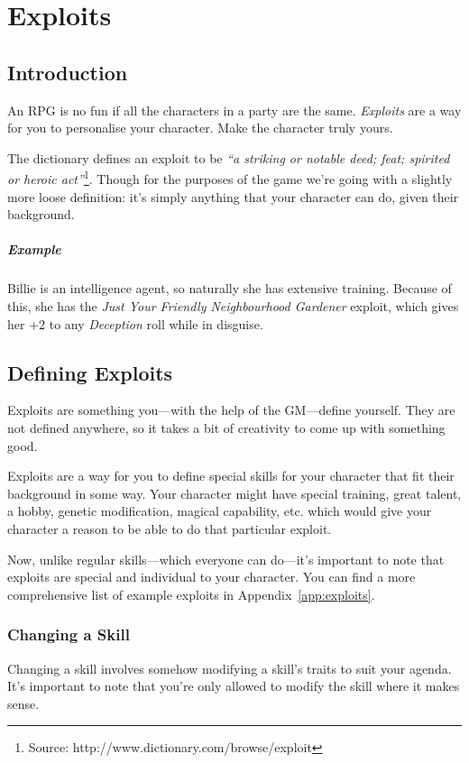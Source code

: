 \chapter{Exploits} \label{chap:exploits}
\section{Introduction}
An RPG is no fun if all the characters in a party are the same. \textit{Exploits} are a way for you to personalise your character. Make the character truly yours.

The dictionary defines an exploit to be \textit{``a striking or notable deed; feat; spirited or heroic act''}\footnote{Source: http://www.dictionary.com/browse/exploit}. 
Though for the purposes of the game we're going with a slightly more loose definition: it's simply anything that your character can do, given their background.

\paragraph{Example} Billie is an intelligence agent, so naturally she has extensive training. Because of this, she has the \textit{Just Your Friendly Neighbourhood Gardener} exploit, which gives her +2 to any \textit{Deception} roll while in disguise.

\section{Defining Exploits}

Exploits are something you---with the help of the GM---define yourself. 
They are not defined anywhere, so it takes a bit of creativity to come up with something good.

Exploits are a way for you to define special skills for your character that fit their background in some way. Your character might have special training, great talent, a hobby, genetic modification, magical capability, etc. which would give your character a reason to be able to do that particular exploit.

Now, unlike regular skills---which everyone can do---it's important to note that exploits are special and individual to your character.
You can find a more comprehensive list of example exploits in Appendix~\ref{app:exploits}.

\subsection{Changing a Skill}
Changing a skill involves somehow modifying a skill's traits to suit your agenda. It's important to note that you're only allowed to modify the skill where it makes sense. 
